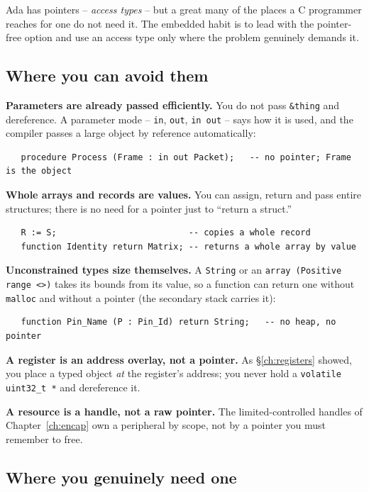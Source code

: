 Ada has pointers -- \emph{access types} -- but a great many of the places a C
programmer reaches for one do not need it. The embedded habit is to lead with the
pointer-free option and use an access type only where the problem genuinely
demands it.

\subsection{Where you can avoid them}

\textbf{Parameters are already passed efficiently.} You do not pass
\texttt{\&thing} and dereference. A parameter mode -- \texttt{in},
\texttt{out}, \texttt{in out} -- says how it is used, and the compiler passes a
large object by reference automatically:

\begin{lstlisting}
   procedure Process (Frame : in out Packet);   -- no pointer; Frame is the object
\end{lstlisting}

\textbf{Whole arrays and records are values.} You can assign, return and pass
entire structures; there is no need for a pointer just to ``return a struct.''

\begin{lstlisting}
   R := S;                          -- copies a whole record
   function Identity return Matrix; -- returns a whole array by value
\end{lstlisting}

\textbf{Unconstrained types size themselves.} A \texttt{String} or an
\texttt{array (Positive range <>)} takes its bounds from its value, so a function
can return one without \texttt{malloc} and without a pointer (the secondary stack
carries it):

\begin{lstlisting}
   function Pin_Name (P : Pin_Id) return String;   -- no heap, no pointer
\end{lstlisting}

\textbf{A register is an address overlay, not a pointer.} As
\S\ref{ch:registers} showed, you place a typed object \emph{at} the register's
address; you never hold a \texttt{volatile uint32\_t *} and dereference it.

\textbf{A resource is a handle, not a raw pointer.} The limited-controlled handles
of Chapter~\ref{ch:encap} own a peripheral by scope, not by a pointer you must
remember to free.

\subsection{Where you genuinely need one}

